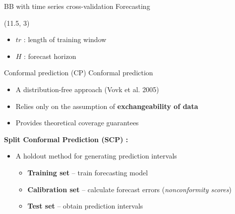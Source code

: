 \documentclass[
  12pt,
  ignorenonframetext,
  aspectratio=169,
]{beamer}
\begin{document}
\begin{frame}{BB with time series cross-validation Forecasting}
\label{bb-with-time-series-cross-validation-forecasting-1}

\begin{textblock}{4}(11.5, 3)
\fontsize{11}{12}\sf
\begin{block}{}
  \begin{itemize}
  \item \color{violet} {$tr$} : \color{black} length of training window \newline
  \item \color{violet} {$H$} : \color{black} forecast horizon \newline
\end{itemize}
\end{block}
\end{textblock}
\end{frame}

\begin{frame}{Conformal prediction (CP)}
\label{conformal-prediction-cp}
\alert{Conformal prediction} \newline

\begin{itemize}
  \item A distribution-free approach (Vovk et al. 2005) 
  \item Relies only on the assumption of \textbf{exchangeability of data} 
  \item Provides theoretical coverage guarantees \newline
\end{itemize}
\pause

\color{violet}\textbf{Split Conformal Prediction (SCP) :}

\begin{itemize}
  \item A holdout method for generating prediction intervals
  \begin{itemize}
  \item \textbf{Training set} -- train forecasting model
  \item \textbf{Calibration set} -- calculate forecast errors (\textit{nonconformity scores}) 
  \item \textbf{Test set} -- obtain prediction intervals
  \end{itemize}
\end{itemize}
\end{frame}
\end{document}
